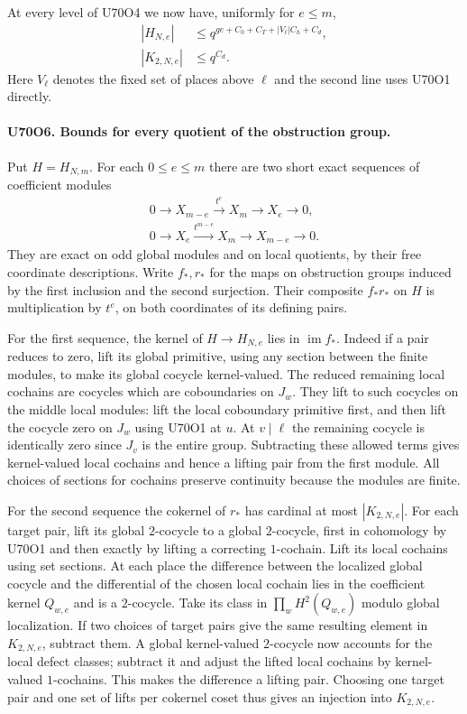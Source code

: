 At every level of U70O4 we now have, uniformly for $e\le m$,
\[
 \begin{split}
 |H_{N,e}|&\le q^{ge+C_0+C_T+|V_\ell|C_h+C_d},\\
 |K_{2,N,e}|&\le q^{C_d}.
 \end{split}
\]
Here $V_\ell$ denotes the fixed set of places above $\ell$ and
the second line uses U70O1 directly.

\paragraph{U70O6. Bounds for every quotient of the obstruction group.}
Put $H=H_{N,m}$. For each $0\le e\le m$ there are two short
exact sequences of coefficient modules
\[
 \begin{split}
 0\to X_{m-e}\xrightarrow{t^e}X_m\to X_e\to0,\\
 0\to X_e\xrightarrow{t^{m-e}}X_m\to X_{m-e}\to0.
 \end{split}
\]
They are exact on odd global modules and on local quotients,
by their free coordinate descriptions. Write $f_*,r_*$ for the
maps on obstruction groups induced by the first inclusion and
the second surjection. Their composite $f_*r_*$ on $H$ is
multiplication by $t^e$, on both coordinates of its defining pairs.

For the first sequence, the kernel of $H\to H_{N,e}$ lies in
$\operatorname{im} f_*$. Indeed if a pair reduces to zero, lift
its global primitive, using any section between the finite modules,
to make its global cocycle kernel-valued. The reduced remaining
local cochains are cocycles which are coboundaries on $J_w$.
They lift to such cocycles on the middle local modules: lift the
local coboundary primitive first, and then lift the cocycle zero
on $J_w$ using U70O1 at $u$. At $v\mid\ell$ the remaining
cocycle is identically zero since $J_v$ is the entire group.
Subtracting these allowed terms gives kernel-valued local cochains
and hence a lifting pair from the first module. All choices of
sections for cochains preserve continuity because the modules are finite.

For the second sequence the cokernel of $r_*$ has cardinal at
most $|K_{2,N,e}|$. For each target pair, lift its global
$2$-cocycle to a global $2$-cocycle, first in cohomology by
U70O1 and then exactly by lifting a correcting $1$-cochain.
Lift its local cochains using set sections. At each place the
difference between the localized global cocycle and the differential
of the chosen local cochain lies in the coefficient kernel
$Q_{w,e}$ and is a $2$-cocycle. Take its class in
$\prod_wH^2(Q_{w,e})$ modulo global localization.
If two choices of target pairs give the same resulting element in
$K_{2,N,e}$, subtract them. A global kernel-valued $2$-cocycle
now accounts for the local defect classes; subtract it and adjust
the lifted local cochains by kernel-valued $1$-cochains. This
makes the difference a lifting pair. Choosing one target pair and
one set of lifts per cokernel coset thus gives an injection into
$K_{2,N,e}$.

